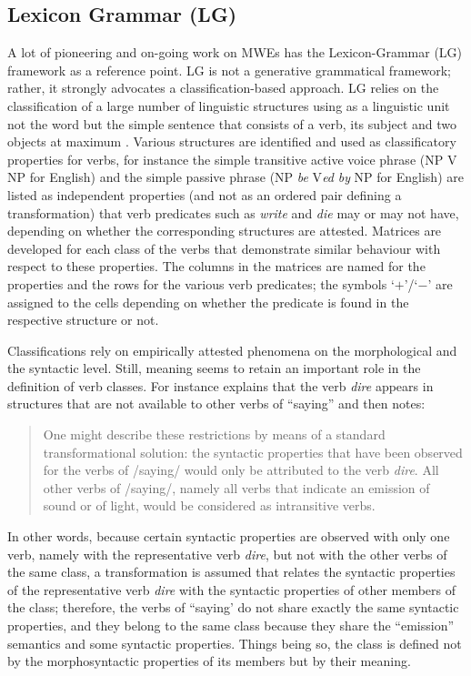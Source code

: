 \documentclass[output=paper]{langsci/langscibook}
\begin{document}
\subsection{Lexicon Grammar (LG)}
\label{Sec-LG} 


A lot of pioneering and on-going work on MWEs has the Lexicon-Grammar (LG) framework as a reference point. LG is not a generative grammatical framework; rather, it strongly advocates a classification-based approach. LG relies on the classification of a large number of linguistic structures using as a linguistic unit not the word but the simple sentence that consists of a verb, its subject and two objects at maximum \citep{Gross:82}.  Various structures are identified and used as classificatory properties for verbs, for instance the simple transitive active voice phrase (NP V NP for English) and the simple passive phrase (NP \textit{be} V\textit{ed} \textit{by} NP for English) are listed as independent properties (and not as an ordered pair defining a transformation) that verb predicates such as \textit{write} and \textit{die} may or may not have, depending on whether the corresponding structures are attested.  Matrices are developed for each class of the verbs that demonstrate similar behaviour with respect to these properties. The columns in the matrices are named for the properties and the rows for the various verb predicates; the symbols `$+$'/`$-$' are assigned to the cells depending on whether the predicate is found in the respective structure or not. 

Classifications rely on empirically attested phenomena on the morphological and the syntactic level. Still, meaning seems to retain an important role in the definition of verb classes. For instance   \citet[401--402]{Gross:75-Relation} explains that the verb {\em dire} appears in structures that are not available to other verbs of ``saying'' and then notes: 

\begin{quote}
One might describe these restrictions by means of a standard transformational solution: the syntactic properties that have been observed for the verbs of /saying/ would only be attributed to the verb {\em dire}. All other verbs of /saying/, namely all verbs that indicate an emission of sound or of light, would be considered as intransitive verbs. \citep[402]{Gross:75-Relation}
\end{quote}

In other words, because certain syntactic properties are observed with only one verb, namely with the representative verb \textit{dire}, but not with the other verbs of the same class, a transformation is assumed that relates the syntactic properties of the representative verb \textit{dire} with the syntactic properties of other members of the class; therefore, the verbs of ``saying' do not share exactly the same syntactic properties, and they belong to the same class because they share the ``emission'' semantics and some syntactic properties. Things being so, the  class is defined not by the morphosyntactic properties of its members but by their meaning.
\end{document}
